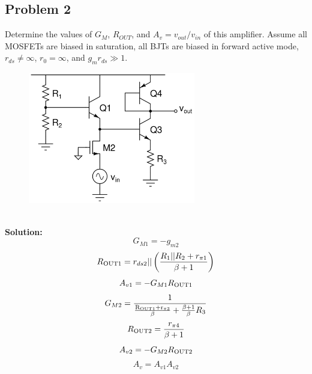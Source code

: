 \documentclass{article}
\begin{document}
\subsection*{Problem 2}
Determine the values of $G_M$, $R_{OUT}$, and $A_v = v_{out}/v_{in}$ of this amplifier.  Assume all MOSFETs are biased in saturation, all BJTs are biased in forward active mode, $r_{ds} \ne \infty$, $r_0 = \infty$, and $g_mr_{ds} \gg 1$.
\begin{figure}[!h]
\begin{center}
    \includegraphics[width=0.65\textwidth]{figures/cc_amp_2.png}
\end{center}
\end{figure}\\
\textbf{Solution:}
$$G_{M1} = -g_{m2}$$
$$R_{\rm OUT1} = r_{ds2}||\left(\frac{R_1||R_2 + r_{\pi 1}}{\beta + 1}\right)$$
$$A_{v1} = -G_{M1}R_{\rm OUT1}$$
$$G_{M2} = \frac{1}{\frac{\rm R_{OUT1} + r_{\pi 3}}{\beta} + \frac{\beta + 1}{\beta} R_3}$$
$$R_{\rm OUT2} = \frac{r_{\pi 4}}{\beta + 1}$$
$$A_{v2} = -G_{M2}R_{\rm OUT2}$$
$$A_{v} = A_{v1}A_{v2}$$
\newpage
\end{document}
